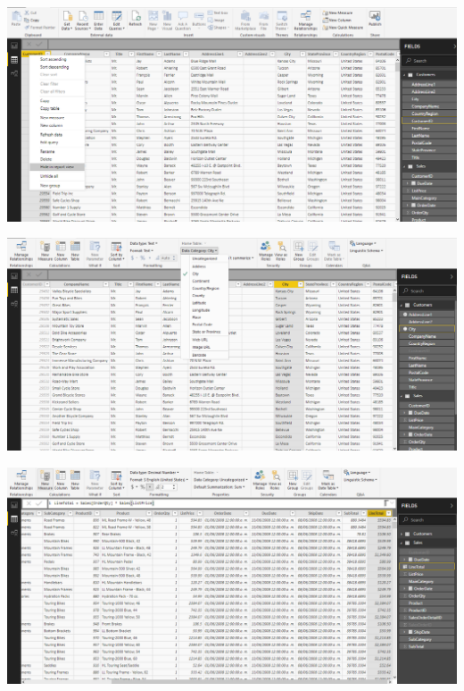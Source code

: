	

	\begin{center}
	\includegraphics[width=15cm]{./Imagenes/Imagen4}
	\end{center}	
\newpage

	\begin{center}
	\includegraphics[width=15cm]{./Imagenes/Imagen5}
	\end{center}	

	\begin{center}
	\includegraphics[width=15cm]{./Imagenes/Imagen6}
	\end{center}	
\newpage

